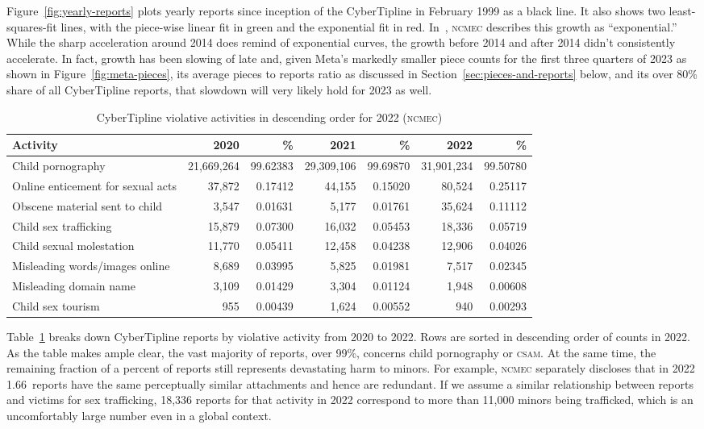 \documentclass[nonacm,screen]{acmart}
\newcommand\V[1]{\textsc{\MakeLowercase{#1}}}
\begin{document}
Figure~\ref{fig:yearly-reports} plots yearly reports since inception of the
CyberTipline in February 1999 as a black line. It also shows two
least-squares-fit lines, with the piece-wise linear fit in green and the
exponential fit in red. In~\cite{NCMEC2023}, \V{NCMEC} describes this growth as
``exponential.'' While the sharp acceleration around 2014 does remind of
exponential curves, the growth before 2014 and after 2014 didn't consistently
accelerate. In fact, growth has been slowing of late and, given Meta's markedly
smaller piece counts for the first three quarters of 2023 as shown in
Figure~\ref{fig:meta-pieces}, its average pieces to reports ratio as discussed
in Section~\ref{sec:pieces-and-reports} below, and its over 80\% share of all
CyberTipline reports, that slowdown will very likely hold for 2023 as well.

\begin{table}
\centering\libertineLF
\caption{CyberTipline violative activities in descending order for 2022 (\V{NCMEC})}
\label{tab:report-contents}
\begin{tabular}{l|rr|rr|rr}
\textbf{Activity}
& \textbf{2020} & \textbf{\%}
& \textbf{2021} & \textbf{\%}
& \textbf{2022} & \textbf{\%}
\\ \hline
Child pornography & 21,669,264 & 99.62383 & 29,309,106 & 99.69870 & 31,901,234 & 99.50780 \\
Online enticement for sexual acts & 37,872 & 0.17412 & 44,155 & 0.15020 & 80,524 & 0.25117 \\
Obscene material sent to child & 3,547 & 0.01631 & 5,177 & 0.01761 & 35,624 & 0.11112 \\
Child sex trafficking & 15,879 & 0.07300 & 16,032 & 0.05453 & 18,336 & 0.05719 \\
Child sexual molestation & 11,770 & 0.05411 & 12,458 & 0.04238 & 12,906 & 0.04026 \\
Misleading words/images online & 8,689 & 0.03995 & 5,825 & 0.01981 & 7,517 & 0.02345 \\
Misleading domain name & 3,109 & 0.01429 & 3,304 & 0.01124 & 1,948 & 0.00608 \\
Child sex tourism & 955 & 0.00439 & 1,624 & 0.00552 & 940 & 0.00293 \\
\end{tabular}
\end{table}

Table~\ref{tab:report-contents} breaks down CyberTipline reports by violative
activity from 2020 to 2022. Rows are sorted in descending order of counts in
2022. As the table makes ample clear, the vast majority of reports, over 99\%,
concerns child pornography or \V{CSAM}. At the same time, the remaining fraction
of a percent of reports still represents devastating harm to minors. For
example, \V{NCMEC} separately discloses that in 2022 1.66~reports have the same
perceptually similar attachments and hence are redundant. If we assume a similar
relationship between reports and victims for sex trafficking, 18,336 reports for
that activity in 2022 correspond to more than 11,000 minors being trafficked,
which is an uncomfortably large number even in a global context.
\end{document}
